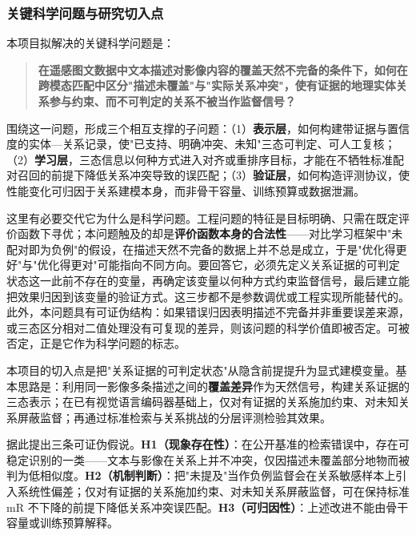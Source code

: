 \subsubsection{关键科学问题与研究切入点}


本项目拟解决的关键科学问题是：

\begin{quote}
\textbf{在遥感图文数据中文本描述对影像内容的覆盖天然不完备的条件下，如何在跨模态匹配中区分"描述未覆盖"与"实际关系冲突"，使有证据的地理实体关系参与约束、而不可判定的关系不被当作监督信号？}
\end{quote}

围绕这一问题，形成三个相互支撑的子问题：（1）\textbf{表示层}，如何构建带证据与置信度的实体—关系记录，使"已支持、明确冲突、未知"三态可判定、可人工复核；（2）\textbf{学习层}，三态信息以何种方式进入对齐或重排序目标，才能在不牺牲标准配对召回的前提下降低关系冲突导致的误匹配；（3）\textbf{验证层}，如何构造评测协议，使性能变化可归因于关系建模本身，而非骨干容量、训练预算或数据泄漏。

这里有必要交代它为什么是科学问题。工程问题的特征是目标明确、只需在既定评价函数下寻优；本问题触及的却是\textbf{评价函数本身的合法性}——对比学习框架中"未配对即为负例"的假设，在描述天然不完备的数据上并不总是成立，于是"优化得更好"与"优化得更对"可能指向不同方向。要回答它，必须先定义关系证据的可判定状态这一此前不存在的变量，再确定该变量以何种方式约束监督信号，最后建立能把效果归因到该变量的验证方式。这三步都不是参数调优或工程实现所能替代的。此外，本问题具有可证伪结构：如果错误归因表明描述不完备并非重要误差来源，或三态区分相对二值处理没有可复现的差异，则该问题的科学价值即被否定。可被否定，正是它作为科学问题的标志。


本项目的切入点是把"关系证据的可判定状态"从隐含前提提升为显式建模变量。基本思路是：利用同一影像多条描述之间的\textbf{覆盖差异}作为天然信号，构建关系证据的三态表示；在已有视觉语言编码器基础上，仅对有证据的关系施加约束、对未知关系屏蔽监督；再通过标准检索与关系挑战的分层评测检验其效果。

据此提出三条可证伪假说。\textbf{H1（现象存在性）}：在公开基准的检索错误中，存在可稳定识别的一类——文本与影像在关系上并不冲突，仅因描述未覆盖部分地物而被判为低相似度。\textbf{H2（机制判断）}：把"未提及"当作负例监督会在关系敏感样本上引入系统性偏差；仅对有证据的关系施加约束、对未知关系屏蔽监督，可在保持标准 mR 不下降的前提下降低关系冲突误匹配。\textbf{H3（可归因性）}：上述改进不能由骨干容量或训练预算解释。

